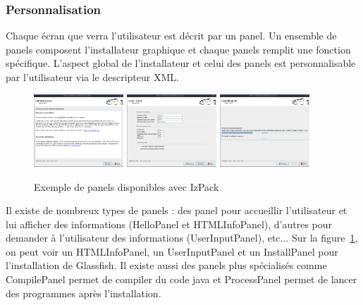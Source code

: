 \subsubsection{Personnalisation}
Chaque écran que verra l'utilisateur est décrit par un panel.
Un ensemble de panels composent l'installateur graphique et chaque panels remplit une fonction spécifique.
L'aspect global de l'installateur et celui des panels est personnalisable par l'utilisateur via le descripteur XML.
\begin{figure}[H]
	\centering
	\includegraphics[width=0.3\textwidth]{../dia/included/install/02.png}
	\includegraphics[width=0.3\textwidth]{../dia/included/install/05.png}
	\includegraphics[width=0.3\textwidth]{../dia/included/install/06.png}
	\caption{Exemple de panels disponibles avec IzPack}
	\label{fig:panelGlass}
\end{figure}
Il existe de nombreux types de panels : des panel pour accueillir l'utilisateur et lui afficher des informations (HelloPanel et HTMLInfoPanel), d'autres pour demander à l'utilisateur des informations (UserInputPanel), etc...
Sur la figure~\ref{fig:panelGlass}, on peut voir un HTMLInfoPanel, un UserInputPanel et un InstallPanel pour l'installation de Glassfish.
Il existe aussi des panels plus spécialisés comme CompilePanel permet de compiler du code java et ProcessPanel permet de lancer des programmes après l'installation.
